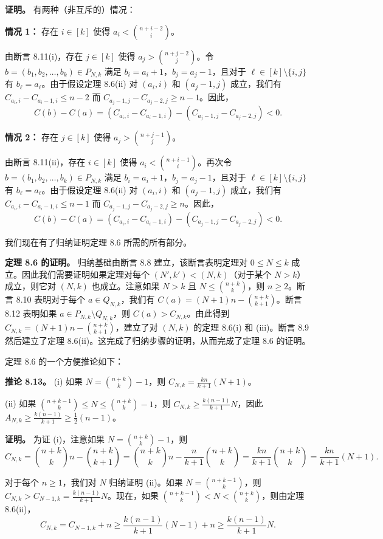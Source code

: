 \documentclass[12pt,a4paper]{ctexart}
\theoremstyle{remark}
\begin{document}
\textbf{证明。} 有两种（非互斥的）情况：

\textbf{情况 1：} 存在 $i\in[k]$ 使得 $a_i<\binom{n+i-2}{i}$。

由断言 8.11(i)，存在 $j\in[k]$ 使得 $a_j>\binom{n+j-2}{j}$。令 $b=(b_1,b_2,\ldots,b_k)\in P_{N,k}$ 满足 $b_i=a_i+1$，$b_j=a_j-1$，且对于 $\ell\in[k]\setminus\{i,j\}$ 有 $b_\ell=a_\ell$。由于假设定理 8.6(ii) 对 $(a_i,i)$ 和 $(a_j-1,j)$ 成立，我们有 $C_{a_i,i}-C_{a_i-1,i}\leq n-2$ 而 $C_{a_j-1,j}-C_{a_j-2,j}\geq n-1$。因此，
$$C(b)-C(a)=(C_{a_i,i}-C_{a_i-1,i})-(C_{a_j-1,j}-C_{a_j-2,j})<0.$$

\textbf{情况 2：} 存在 $j\in[k]$ 使得 $a_j>\binom{n+j-1}{j}$。

由断言 8.11(ii)，存在 $i\in[k]$ 使得 $a_i<\binom{n+i-1}{i}$。再次令 $b=(b_1,b_2,\ldots,b_k)\in P_{N,k}$ 满足 $b_i=a_i+1$，$b_j=a_j-1$，且对于 $\ell\in[k]\setminus\{i,j\}$ 有 $b_\ell=a_\ell$。由于假设定理 8.6(ii) 对 $(a_i,i)$ 和 $(a_j-1,j)$ 成立，我们有 $C_{a_i,i}-C_{a_i-1,i}\leq n-1$ 而 $C_{a_j-1,j}-C_{a_j-2,j}\geq n$。因此，
$$C(b)-C(a)=(C_{a_i,i}-C_{a_i-1,i})-(C_{a_j-1,j}-C_{a_j-2,j})<0.$$

我们现在有了归纳证明定理 8.6 所需的所有部分。

\textbf{定理 8.6 的证明。} 归纳基础由断言 8.8 建立，该断言表明定理对 $0\leq N\leq k$ 成立。因此我们需要证明如果定理对每个 $(N',k')<(N,k)$（对于某个 $N>k$）成立，则它对 $(N,k)$ 也成立。注意如果 $N>k$ 且 $N\leq\binom{n+k}{k}$，则 $n\geq 2$。断言 8.10 表明对于每个 $a\in Q_{N,k}$，我们有 $C(a)=(N+1)n-\binom{n+k}{k+1}$。断言 8.12 表明如果 $a\in P_{N,k}\setminus Q_{N,k}$，则 $C(a)>C_{N,k}$。由此得到 $C_{N,k}=(N+1)n-\binom{n+k}{k+1}$，建立了对 $(N,k)$ 的定理 8.6(i) 和 (iii)。断言 8.9 然后建立了定理 8.6(ii)。这完成了归纳步骤的证明，从而完成了定理 8.6 的证明。

定理 8.6 的一个方便推论如下：

\textbf{推论 8.13。} (i) 如果 $N=\binom{n+k}{k}-1$，则 $C_{N,k}=\frac{kn}{k+1}(N+1)$。

(ii) 如果 $\binom{n+k-1}{k}\leq N\leq\binom{n+k}{k}-1$，则 $C_{N,k}\geq\frac{k(n-1)}{k+1}N$，因此 $A_{N,k}\geq\frac{k(n-1)}{k+1}\geq\frac{1}{2}(n-1)$。

\textbf{证明。} 为证 (i)，注意如果 $N=\binom{n+k}{k}-1$，则
$$C_{N,k}=\binom{n+k}{k}n-\binom{n+k}{k+1}=\binom{n+k}{k}n-\frac{n}{k+1}\binom{n+k}{k}=\frac{kn}{k+1}\binom{n+k}{k}=\frac{kn}{k+1}(N+1).$$

对于每个 $n\geq 1$，我们对 $N$ 归纳证明 (ii)。如果 $N=\binom{n+k-1}{k}$，则 $C_{N,k}>C_{N-1,k}=\frac{k(n-1)}{k+1}N$。现在，如果 $\binom{n+k-1}{k}<N<\binom{n+k}{k}$，则由定理 8.6(ii)，
$$C_{N,k}=C_{N-1,k}+n\geq\frac{k(n-1)}{k+1}(N-1)+n\geq\frac{k(n-1)}{k+1}N.$$
\end{document}
